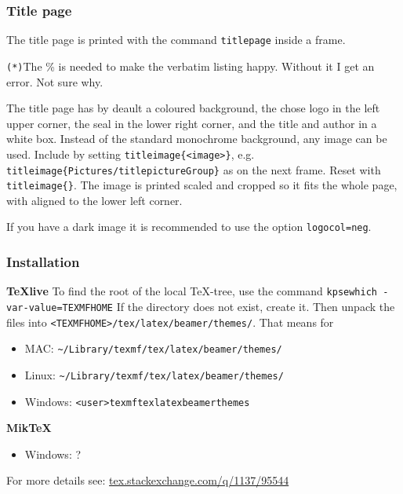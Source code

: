 \documentclass[aspectratio=1610]{beamer}
\def\txtbs{\symbol{92}}
\begin{document}
\begin{frame}[fragile]
  \frametitle{Title page}
  The title page is printed with the command \texttt{\txtbs titlepage} inside a frame.
\begin{CodeBox}{}
\begin{frame}[plain]%
  \titlepage
\end{frame}%
\end{CodeBox}
\verb|(*)|{\footnotesize The \% is needed to make the verbatim listing happy. Without it I get an error. Not sure why.}

\strut\par

The title page has by deault a coloured background, the chose logo in the left upper corner, the seal in the lower right corner, and the title and author in a white box. Instead of the standard monochrome background, any image can be used. Include by setting \texttt{\txtbs titleimage\{<image>\}}, e.g. \texttt{\txtbs titleimage\{Pictures/titlepictureGroup\}} as on the next frame. Reset with \texttt{\txtbs titleimage\{\}}. The image is printed scaled and cropped so it fits the whole page, with aligned to the lower left corner.
\par\strut\par
If you have a dark image it is recommended to use the option \texttt{logocol=neg}. 
\end{frame}

\begin{frame}[plain]
  \titlepage
\end{frame}
\titleimage{}

\begin{frame}%
  \frametitle{Installation}
  \textbf{TeXlive}\newline
  To find the root of the local TeX-tree, use the command\newline
  \texttt{kpsewhich -var-value=TEXMFHOME}\newline
  If the directory does not exist, create it. Then unpack the files into \texttt{<TEXMFHOME>/tex/latex/beamer/themes/}. That means for 
  \begin{itemize}
  \item MAC: \texttt{\~{}/Library/texmf/tex/latex/beamer/themes/}
  \item Linux: \texttt{\~{}/Library/texmf/tex/latex/beamer/themes/}
  \item Windows: \texttt{<user>\txtbs texmf\txtbs tex\txtbs latex\txtbs beamer\txtbs themes\txtbs}
  \end{itemize}
  \textbf{MikTeX}
  \begin{itemize}
  \item Windows: ?
  \end{itemize}
  \par\strut\par
  For more details see: \href{https://tex.stackexchange.com/q/1137/95544}{tex.stackexchange.com/q/1137/95544}
\end{frame}
\end{document}
